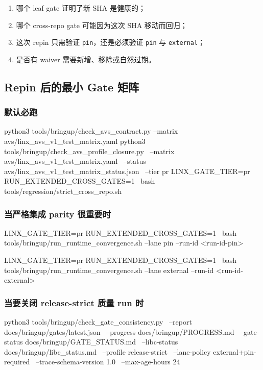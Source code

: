 \documentclass[UTF8,11pt,a4paper]{ctexart}
\begin{document}
\begin{enumerate}
  \item 哪个 leaf gate 证明了新 SHA 是健康的；
  \item 哪个 cross-repo gate 可能因为这次 SHA 移动而回归；
  \item 这次 repin 只需验证 \texttt{pin}，还是必须验证 \texttt{pin} 与
  \texttt{external}；
  \item 是否有 waiver 需要新增、移除或自然过期。
\end{enumerate}

\subsection{Repin 后的最小 Gate 矩阵}

\subsubsection{默认必跑}

\begin{CodeBlock}
python3 tools/bringup/check_avs_contract.py --matrix avs/linx_avs_v1_test_matrix.yaml
python3 tools/bringup/check_avs_profile_closure.py \
  --matrix avs/linx_avs_v1_test_matrix.yaml \
  --status avs/linx_avs_v1_test_matrix_status.json \
  --tier pr
LINX_GATE_TIER=pr RUN_EXTENDED_CROSS_GATES=1 \
bash tools/regression/strict_cross_repo.sh
\end{CodeBlock}

\subsubsection{当严格集成 parity 很重要时}

\begin{CodeBlock}
LINX_GATE_TIER=pr RUN_EXTENDED_CROSS_GATES=1 \
bash tools/bringup/run_runtime_convergence.sh --lane pin --run-id <run-id-pin>

LINX_GATE_TIER=pr RUN_EXTENDED_CROSS_GATES=1 \
bash tools/bringup/run_runtime_convergence.sh --lane external --run-id <run-id-external>
\end{CodeBlock}

\subsubsection{当要关闭 release-strict 质量 run 时}

\begin{CodeBlock}
python3 tools/bringup/check_gate_consistency.py \
  --report docs/bringup/gates/latest.json \
  --progress docs/bringup/PROGRESS.md \
  --gate-status docs/bringup/GATE_STATUS.md \
  --libc-status docs/bringup/libc_status.md \
  --profile release-strict \
  --lane-policy external+pin-required \
  --trace-schema-version 1.0 \
  --max-age-hours 24
\end{CodeBlock}
\end{document}
